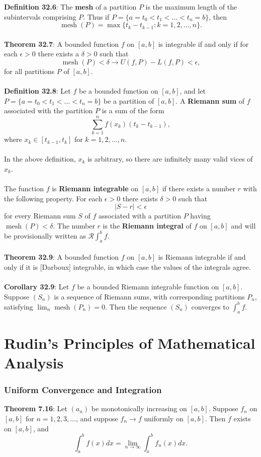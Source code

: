 \documentclass{article}
\theoremstyle{definition}
\DeclareMathOperator{\Mesh}{mesh}
\begin{document}
\textbf{Definition 32.6}: The \textbf{mesh} of a partition $P$ is the maximum length of the subintervals comprising $P$. Thus if $P = \{a = t_0 < t_1 < \dots < t_n = b\}$, then $$\Mesh(P) = \max\{t_k - t_{k - 1} : k = 1, 2, \dots, n\}.$$ \\
\textbf{Theorem 32.7}: A bounded function $f$ on $[a, b]$ is integrable if and only if for each $\epsilon > 0$ there exists a $\delta > 0$ such that $$\Mesh(P) < \delta \rightarrow U(f,P) - L(f,P) < \epsilon,$$ for all partitions $P$ of $[a, b]$. \\ \\
\textbf{Definition 32.8}: Let $f$ be a bounded function on $[a, b]$, and let $P = \{a = t_0 < t_1 < \dots < t_n = b\}$ be a partition of $[a, b]$. A \textbf{Riemann sum} of $f$ associated with the partition $P$ is a sum of the form $$\sum_{k = 1}^n f(x_k)(t_k - t_{k - 1}),$$ where $x_k \in [t_{k - 1}, t_k]$ for $k = 1, 2, \dots, n$. \\ \\
In the above definition, $x_k$ is arbitrary, so there are infinitely many valid vices of $x_k$. \\ \\
The function $f$ is \textbf{Riemann integrable} on $[a, b]$ if there exists a number $r$ with the following property. For each $\epsilon > 0$ there exists $\delta > 0$ such that $$|S - r| < \epsilon$$ for every Riemann sum $S$ of $f$ associated with a partition $P$ having $\Mesh(P) < \delta$. The number $r$ is the \textbf{Riemann integral} of $f$ on $[a, b]$ and will be provisionally written as $\mathcal{R}\int_a^b f$. \\ \\
\textbf{Theorem 32.9}: A bounded function $f$ on $[a, b]$ is Riemann integrable if and only if it is [Darboux] integrable, in which case the values of the integrals agree. \\ \\
\textbf{Corollary 32.9}: Let $f$ be a bounded Riemann integrable function on $[a, b]$. Suppose $(S_n)$ is a sequence of Riemann sums, with corresponding partitions $P_n$, satisfying $\lim_n \Mesh(P_n) = 0$. Then the sequence $(S_n)$ converges to $\int_a^b f.$
\section*{Rudin's Principles of Mathematical Analysis}
\subsubsection*{Uniform Convergence and Integration}
\textbf{Theorem 7.16}: Let $(a_n)$ be monotonically increasing on $[a, b]$. Suppose $f_n$ on $[a, b]$ for $n = 1, 2, 3, \dots$, and suppose $f_n \rightarrow f$ uniformly on $[a, b]$. Then $f$ exists on $[a, b]$, and $$\int_a^b f(x) dx = \lim_{n \rightarrow \infty} \int_a^b f_n(x) dx.$$
\end{document}
